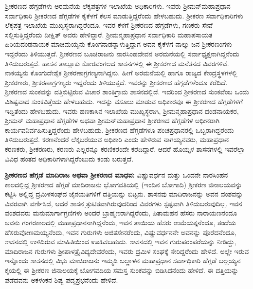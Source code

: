 ಶ‍್ರೀಕರಣದ ಹೆಗ್ಗಡೆಗಳು ಅರಮನೆಯ ಲೆಕ್ಕಪತ್ರಗಳ ಇಲಾಖೆಯ ಅಧಿಕಾರಿಗಳು. ಇವರು ಶ‍್ರೀಮನ್​ಮಹಾಪ್ರಧಾನ ಸರ್ವಾಧಿಕಾರಿ ಶ‍್ರೀಕರಣದ ಹೆಗ್ಗಡೆಗಳ ಕೈಕೆಳಗೆ ಕೆಲಸ ಮಾಡುತ್ತಿದ್ದರೆಂದು ಹೇಳಬಹುದು. ಶ‍್ರೀಕರಣ ಸರ್ವಾಧಿಕಾರಿಗಳು ಲೆಕ್ಕಪತ್ರ ಇಲಾಖೆಯ ಮುಖ್ಯಸ್ಥರಾಗಿದ್ದರೆಂದೂ, ಇವರ ಕೆಳಗೆ ಶ‍್ರೀಕರಣದ ಹೆಗ್ಗಡೆಗಳು, ಗಣಕರು ಸೇವೆ ಸಲ್ಲಿಸುತ್ತಿದ್ದರೆಂದು ದೀಕ್ಷಿತ್​ ಅವರು ಹೇಳಿದ್ದಾರೆ. ಶ‍್ರೀಮನ್ಮಹಾಪ್ರಧಾನ ಸರ್ವಾಧಿಕಾರಿ ಮಹಾಪಸಾಯತ ಹಿರಿಯದಂಡನಾಯಕ ಮಾಚಿಮಯ್ಯನು ಕೊಂಗನಾಡನ್ನಾಳುತ್ತಿದ್ದಾಗ ಅವನ ಕೈಕೆಳಗೆ ನಾಲ್ಕು ಜನ ಶ‍್ರೀಕರಣಂಗಳು ಇದ್ದರೆಂದು ತಿಳಿಯುತ್ತದೆ. ಶ‍್ರೀಕರಣದ ಬೂಚಿರಾಜನು ನಾರಸಿಂಹದೇವನ ಅರಮನೆಯಲ್ಲಿ ಸರ್ವಾಧ್ಯಕ್ಷನಾಗಿದ್ದನೆಂದು ತಿಳಿದುಬರುತ್ತದೆ. ಹಾಸನ ತಾಲ್ಲೂಕು ಕೋರವಂಗಲದ ಶಾಸನಗಳಲ್ಲಿ ಈ ಶ‍್ರೀಕರಣದ ಮನೆತನದ ವಿವರಗಳಿವೆ. ನಾಕಯ್ಯನು ಕೊಂಗುದೇಶೈಕ ಶ‍್ರೀಕರಣಾಗ್ರಗಣ್ಯ\-ನಾಗಿದ್ದನು. ಹೀಗೆ ಅರಮನೆಯಲ್ಲಿ ಹಾಗೂ ರಾಜ್ಯದ ಕೇಂದ್ರಸ್ಥಳಗಳಲ್ಲಿ ಶ‍್ರೀಕರಣರು, ಶ‍್ರೀಕರಣಾಗ್ರಗಣ್ಯರು ಇದ್ದರೆಂದು ತಿಳಿಯುತ್ತದೆ. ಇವರನ್ನು ಶ‍್ರೀಕರಣದ ಹೆಗ್ಗಡೆಗಳೆಂದೂ ಕರೆದಿದೆ. ಶ‍್ರೀಕರಣದ ಸುಂಕವನ್ನು ದತ್ತಿಬಿಟ್ಟಿರುವ ವಿಚಾರ ಶಾಂತಿಗ್ರಾಮ ಶಾಸನದಲ್ಲಿದೆ. ಇದರಿಂದ ಶ‍್ರೀಕರಣದ ಸುಂಕವೆಂಬ ಒಂದು ವಿಶಿಷ್ಟವಾದ ಸುಂಕವಿತ್ತೆಂದು ಹೇಳಬಹುದು. ಇದನ್ನು ವಸೂಲು ಮಾಡುವ ಅಧಿಕಾರವೂ ಈ ಶ‍್ರೀಕರಣದ ಹೆಗ್ಗಡೆಗಳಿಗೆ ಇದ್ದಿತೆಂದು ಹೇಳಬಹುದು. ಇವರು ಹಣಕಾಸಿನ ಇಲಾಖೆಯ ಮುಖ್ಯಸ್ಥರಾಗಿ, ಶ‍್ರೀಮನ್ಮಹಾಪ್ರಧಾನ ದಂಡನಾಯಕರ, ಶ‍್ರೀಮನ್​ ಮಹಾಪ್ರಧಾನ ಹೆಗ್ಗಡೆಗಳ ಅಥವಾ ಶ‍್ರೀಮನ್​ಮಹಾಪ್ರಧಾನ ಶ‍್ರೀಕರಣದ ಹೆಗ್ಗಡೆಗಳ ಅಧೀನರಾಗಿ ಕಾರ್ಯವನಿರ್ವಹಿಸುತ್ತಿದ್ದರೆಂದು ಹೇಳಬಹುದು. ಶ‍್ರೀಕರಣದ ಹೆಗ್ಗಡೆಗಳೂ ಪಂಚಪ್ರಧಾನರಲ್ಲಿ ಒಬ್ಬರಾಗಿದ್ದರೆಂದು ತಿಳಿದುಬರುತ್ತದೆ. ಕರಣನೆಂದರೆ ಲೆಕ್ಕಬರೆಯುವ ಅಧಿಕಾರಿ ಎಂದು ಹೇಳಿರುವ ನಾಗಯ್ಯನವರು, ಮಹಾಪ್ರಧಾನ ಕರಣಕರು, ಶ‍್ರೀಕರಣರು, ಕರಣರು ಎಲ್ಲರನ್ನೂ ಕರಣಿಕರೆಂದೇ ಕರೆದಿದ್ದಾರೆ. ಆದರೆ ಹೊಯ್ಸಳ ಶಾಸನಗಳಲ್ಲಿ ಇವರೆಲ್ಲಾ ವಿವಿಧ ಹಂತದ ಅಧಿಕಾರಿಗಳಾಗಿದ್ದ\-ರೆಂಬುದು ಕಂಡು ಬರುತ್ತದೆ.

\textbf{ಶ‍್ರೀಕರಣದ ಹೆಗ್ಗಡೆ ಮಾದಿರಾಜ ಅಥವಾ ಶ‍್ರೀಕರಣದ ಮಾಧವ:} ವಿಷ್ಣುವರ್ಧನ ಮತ್ತು ಒಂದನೇ ನಾರಸಿಂಹನ ಕಾಲದಲ್ಲಿದ್ದ ಶ‍್ರೀಕರಣದ ಹೆಗ್ಗಡೆ ಮಾದಿರಾಜನು ಭೋಗವತಿಯಲ್ಲಿ (ಇಂದಿನ ಬೋಗಾದಿ) ಶ‍್ರೀಕರಣ ಜಿನಾಲಯವನ್ನು ಕಟ್ಟಿಸಿ ಅಲ್ಲಿದ್ದ ದ್ರಮಿಳಸಂಘದ ಜೈನಯತಿಗಳಿಗೆ ದತ್ತಿಯನ್ನು ಬಿಟ್ಟನು. ಶಾಸನವು ಮಾದಿರಾಜನನ್ನು ಅವನ ವಂಶವನ್ನು ವಿವರವಾಗಿ ವರ್ಣಿಸಿದೆ, ಆದರೆ ಶಾಸನ ತ್ರುಟಿತವಾಗಿರುವುದರಿಂದ ವಿವರಗಳು ಸ್ಪಷ್ಟವಾಗಿ ತಿಳಿದುಬರುವುದಿಲ್ಲ. ಇವನ ವಂಶದವರು ಮನುಮಾರ್ಗಾಗ್ರಣಿಗಳು ಅಂದರೆ ಬ್ರಾಹ್ಮಣರಾಗಿದ್ದರೆಂದು, ಪಿತಾಮಹನ ಹೆಸರು ನಾರಾಯಣನೆಂದೂ ಅವನು ಗಂಗರಕಾಲದಲ್ಲಿ ಮಹಾಪ್ರಧಾನನಾಗಿದ್ದನೆಂದು, ಇವನ ತಾಯಿಯ ಹೆಸರು ಉಮೆಯಕ್ಕನೆಂದೂ, ತಂದೆಯ ಹೆಸರು\break ವೋಣಮಯ್ಯನೆಂದು, ಇವನ ಗುರುಗಳು ಅಜಿತಸೇನರೆಂದು, ವಿಷ್ಣುವರ್ಧನನೇ ಅವನನ್ನು ಪೊರೆದನೆಂದೂ, ಶಾಸನದಲ್ಲಿ ಉಳಿದಿರುವ ಮಾಹಿತಿಯಿಂದ ಊಹಿಸಬಹುದು. ಶಾಸನದಲ್ಲಿ ಇವನ ಗುರುಪರಂಪರೆಯನ್ನು ನೀಡಿದ್ದು, ಮಾದಿರಾಜನ ಗುರುಗಳು ಶ‍್ರೀಪಾಳತ್ರೈವಿದ್ಯದೇವರೆಂದು, ಇವರು ದ್ರಮಿಳ ಸಂಘಕ್ಕೆ ಸೇರಿದ್ದರೆಂದು ಹೇಳಿದೆ. ಅಲ್ಲೇ ಇರುವ ಇನ್ನೊಂದು ಶಾಸನದಲ್ಲಿ ವಿಭು ಮಾಚಿರಾಜನು ಇಮ್ಮಡಿ ಬಲ್ಲಾಳನ ಮಹಾಪ್ರಧಾನ ಸರ್ವಾಧಿಕಾರಿ ಹೆಗ್ಗಡೆ ಬಲ್ಲಯ್ಯನ ಕೈಯಲ್ಲಿ ಈ ಶ‍್ರೀಕರಣ ಜಿನಾಲಯಕ್ಕೆ ಬೋಗವದಿಯ ಸಮಸ್ತ ಸುಂಕವನ್ನು ಬಿಡಿಸಿದನೆಂದು ಹೇಳಿದೆ. ಈ ದತ್ತಿಯನ್ನು ಪಡೆದವನು ಅಕಳಂಕನ ಶಿಷ್ಯ ಪದ್ಮಪ್ರಭನೆಂದು ಹೇಳಿದೆ.

